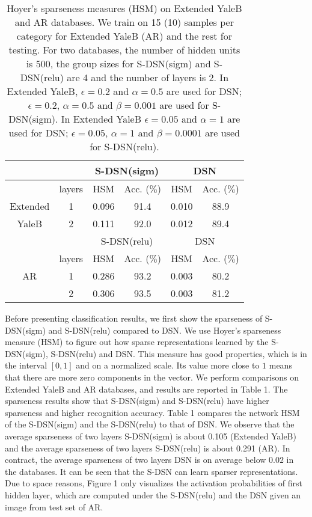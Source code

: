 \documentclass[letterpaper]{article}
\begin{document}
\begin{table}[t]
\small{\caption{Hoyer's sparseness measures (HSM) on Extended YaleB and AR databases. We train on 15 (10) samples per category for Extended YaleB (AR) and the rest for testing. For two databases, the number of hidden units is 500, the group sizes for S-DSN(sigm) and S-DSN(relu) are 4 and the number of layers is 2. In Extended YaleB, $\epsilon=0.2$ and $\alpha=0.5$ are used for DSN; $\epsilon=0.2$, $\alpha=0.5$ and $\beta=0.001$ are used for S-DSN(sigm). In Extended YaleB $\epsilon=0.05$ and $\alpha=1$ are used for DSN; $\epsilon=0.05$, $\alpha=1$ and $\beta=0.0001$ are used for S-DSN(relu).}}
\label{tab:hspm}
\begin{center}
\small{
\begin{tabular}{c|c|c|c|c|c}
\hline
\multicolumn{2}{c|}{} & \multicolumn{2}{c|}{S-DSN(sigm)} & \multicolumn{2}{c}{DSN} \\
\hline
\multicolumn{1}{c|}{}         & layers   & HSM &Acc. ($\%$) & HSM &Acc. ($\%$)   \\
\multicolumn{1}{c|}{Extended} & 1  &0.096& 91.4  &0.010& 88.9    \\
\multicolumn{1}{c|}{YaleB}    & 2  &0.111& 92.0  &0.012& 89.4  \\
\hline
\multicolumn{2}{c|}{} & \multicolumn{2}{c|}{S-DSN(relu)} & \multicolumn{2}{c}{DSN} \\
\hline
\multicolumn{1}{c|}{}        & layers   & HSM &Acc. ($\%$) & HSM &Acc. ($\%$) \\
\multicolumn{1}{c|}{AR}      & 1  &0.286& 93.2  &0.003& 80.2  \\
\multicolumn{1}{c|}{ }       & 2  &0.306& 93.5  &0.003& 81.2  \\
\hline
\end{tabular}}
\end{center}
\vskip -0.2in
\end{table}

Before presenting classification results, we first show the sparseness of S-DSN(sigm) and S-DSN(relu) compared to DSN. We use Hoyer's sparseness measure (HSM) \cite{Hoyer2004} to figure out how sparse representations learned by the S-DSN(sigm), S-DSN(relu) and DSN. This measure has good properties, which is in the interval $[0, 1]$ and on a normalized scale. Its value more close to $1$ means that there are more zero components in the vector. We perform comparisons on Extended YaleB and AR databases, and results are reported in Table 1. The sparseness results show that S-DSN(sigm) and S-DSN(relu) have higher sparseness and higher recognition accuracy. Table 1 compares the network HSM of the S-DSN(sigm) and the S-DSN(relu) to that of DSN. We observe that the average sparseness of two layers S-DSN(sigm) is about 0.105 (Extended YaleB) and the average sparseness of two layers S-DSN(relu) is about 0.291 (AR). In contract, the average sparseness of two layers DSN is on average below $0.02$ in the databases. It can be seen that the S-DSN can learn sparser representations. Due to space reasons, Figure 1 only visualizes the activation probabilities of first hidden layer, which are computed under the S-DSN(relu) and the DSN given an image from test set of AR.
\end{document}

